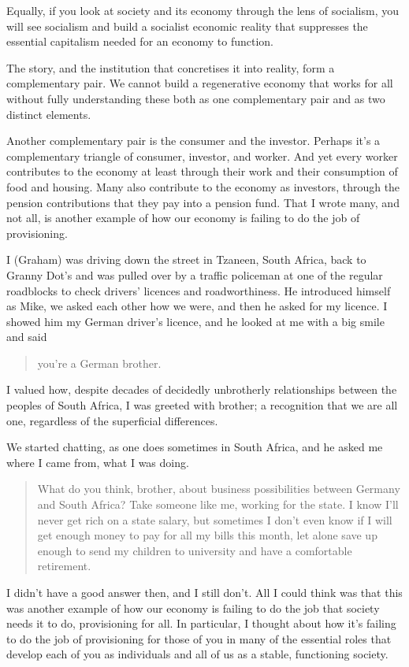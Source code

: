 Equally, if you look at society and its economy through the lens of socialism, you will see socialism and build a socialist economic reality that suppresses the essential capitalism needed for an economy to function. 


The story, and the institution that concretises it into reality, form a complementary pair. We cannot build a regenerative economy that works for all without fully understanding these both as one complementary pair and as two distinct elements.


Another complementary pair is the consumer and the investor. Perhaps it's a complementary triangle of consumer, investor, and worker. And yet every worker contributes to the economy at least through their work and their consumption of food and housing. Many also contribute to the economy as investors, through the pension contributions that they pay into a pension fund. That I wrote many, and not all, is another example of how our economy is failing to do the job of provisioning.


\begin{longstoryblock}
I (Graham) was driving down the street in Tzaneen, South Africa, back to Granny Dot’s and was pulled over by a traffic policeman at one of the regular roadblocks to check drivers’ licences and roadworthiness. He introduced himself as Mike, we asked each other how we were, and then he asked for my licence. I showed him my German driver's licence, and he looked at me with a big smile and said \begin{quote}you're a German brother.\end{quote} I valued how, despite decades of decidedly unbrotherly relationships between the peoples of South Africa, I was greeted with brother; a recognition that we are all one, regardless of the superficial differences.


We started chatting, as one does sometimes in South Africa, and he asked me where I came from, what I was doing. 


\begin{quote}What do you think, brother, about business possibilities between Germany and South Africa? Take someone like me, working for the state. I know I'll never get rich on a state salary, but sometimes I don't even know if I will get enough money to pay for all my bills this month, let alone save up enough to send my children to university and have a comfortable retirement.\end{quote}


I didn't have a good answer then, and I still don't. All I could think was that this was another example of how our economy is failing to do the job that society needs it to do, provisioning for all. In particular, I thought about how it's failing to do the job of provisioning for those of you in many of the essential roles that develop each of you as individuals and all of us as a stable, functioning society.
\end{longstoryblock}


